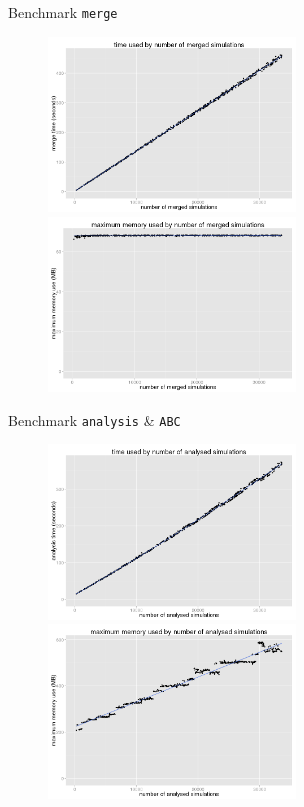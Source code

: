 \documentclass[10pt, aspectratio=43]{beamer}
\begin{document}
\begin{frame}{}{Benchmark \texttt{merge}}
\begin{figure}
  \hspace*{-1cm}
  \includegraphics[width=0.585\textwidth]{../data/merge-timeByNSimulations.png}%
  \includegraphics[width=0.585\textwidth]{../data/merge-maxMemByNSimulations.png}
\end{figure}
\end{frame}

\begin{frame}{}{Benchmark \texttt{analysis} \& \texttt{ABC}}
\begin{figure}
  \hspace*{-1cm}
  \includegraphics[width=0.585\textwidth]{../data/analysis-timeByNSimulations.png}%
  \includegraphics[width=0.585\textwidth]{../data/analysis-maxMemByNSimulations.png}
\end{figure}
\end{frame}
\end{document}
